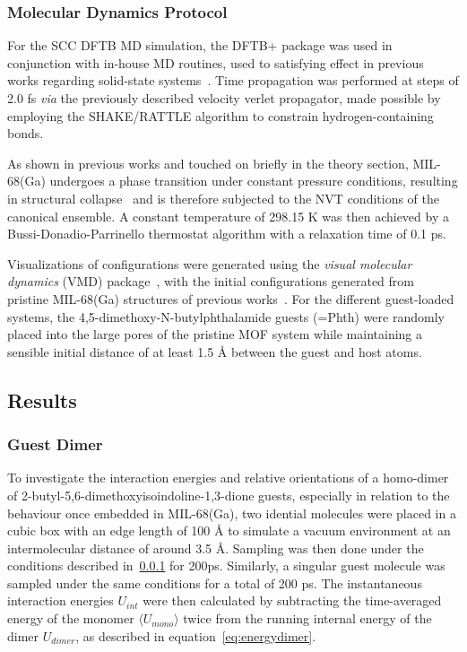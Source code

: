 \documentclass[11pt]{article}
\begin{document}
\subsubsection{Molecular Dynamics Protocol}\label{setup}
For the SCC DFTB MD simulation, the DFTB+ package was used in conjunction with in-house MD routines, used to satisfying effect in previous works regarding solid-state systems~\cite{Hofer2015-wy,Saleh2019-yz,Prasetyo2019-eh}. Time propagation was performed at steps of 2.0 fs \textit{via} the previously described velocity verlet propagator, made possible by employing the SHAKE/RATTLE algorithm to constrain hydrogen-containing bonds.
\\ \par \noindent As shown in previous works and touched on briefly in the theory section, MIL-68(Ga) undergoes a phase transition under constant pressure conditions, resulting in structural collapse~\cite{Purtscher2023,Fischereder2023} and is therefore subjected to the NVT conditions of the canonical ensemble. A constant temperature of 298.15 K was then achieved by a Bussi-Donadio-Parrinello thermostat algorithm with a relaxation time of 0.1 ps.
\\ \par \noindent Visualizations of configurations were generated using the \textit{visual molecular dynamics} (VMD) package~\cite{Humphrey1996}, with the initial configurations generated from pristine MIL-68(Ga) structures of previous works~\cite{Fischereder2023}. For the different guest-loaded systems, the 4,5-dimethoxy-N-butylphthalamide guests (=Phth) were randomly placed into the large pores of the pristine MOF system while maintaining a sensible initial distance of at least 1.5 Å between the guest and host atoms.

\subsection{Results}
\subsubsection{Guest Dimer}
To investigate the interaction energies and relative orientations of a homo-dimer of 2-butyl-5,6-dimethoxyisoindoline-1,3-dione guests, especially in relation to the behaviour once embedded in MIL-68(Ga), two idential molecules were placed in a cubic box with an edge length of 100 Å to simulate a vacuum environment at an intermolecular distance of around 3.5 Å. Sampling was then done under the conditions described in~\ref{setup} for  200ps.  Similarly, a singular guest molecule was sampled under the same conditions for a total of 200 ps. The instantaneous interaction energies $U_{int}$ were then calculated by subtracting the time-averaged energy of the monomer $\langle U_{mono}\rangle$ twice from the running internal energy of the dimer $U_{dimer}$, as described in equation~\ref{eq:energydimer}.
\end{document}
